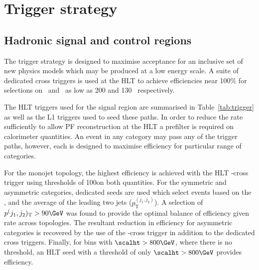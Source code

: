 \section{Trigger strategy}
\label{sec:ana-trigger}

\subsection{Hadronic signal and control regions}

The trigger strategy is designed to maximise acceptance for an inclusive set of new physics 
models which may be produced at a low energy scale. A suite of dedicated cross triggers 
is used at the HLT to achieve efficiencies near 100\% for selections on
\scalht~and \mht~as low as 200 and 130 \GeV~respectively. 

The HLT triggers used for the signal region are summarised in Table~\ref{tab:trigger} as well as the L1 triggers
used to seed these paths. In order to reduce the rate sufficiently to allow PF reconstruction at the HLT
a prefilter is required on calorimeter quantities. An event in any category may pass any of the trigger
paths, however, each is designed to maximise efficiency for particular range of categories.

For the monojet topology, the highest efficiency is achieved with the HLT
\mht-\met cross trigger using thresholds of 100\GeV on both quantities. For the symmetric and asymmetric
categories, dedicated seeds are used which select events based on the \alphat, \scalht and the 
average \pt of the leading two jets ($p^(j_1,j_2)_{\text{T}}$). A selection of
$p^(j_1,j_2)_{\text{T}} > 90\GeV$ was found to provide the optimal 
balance of efficiency given rate across topologies. The resultant reduction in efficiency for 
asymmetric categories is recovered by the use of the \mht-\met cross trigger in addition to the dedicated cross triggers.
Finally, for bins with $\scalht > 800 \GeV$, where there is no \alphat threshold, 
an HLT seed with a threshold of only $\scalht > 800\GeV$ provides efficiency.


